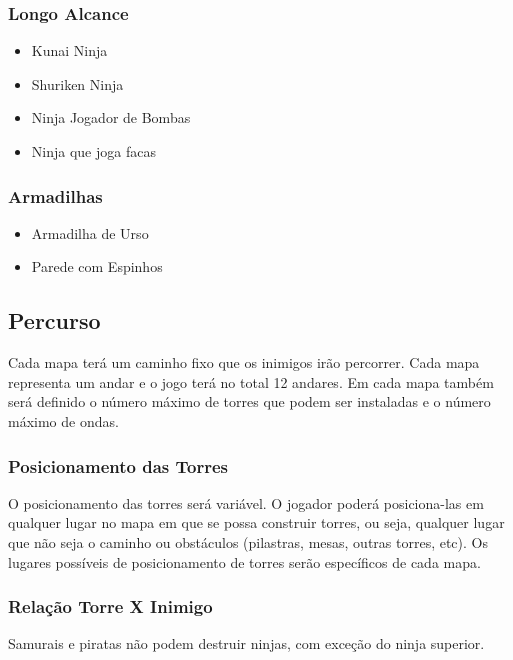 \documentclass[10pt,a4paper]{article}
\begin{document}
\subsubsection{Longo Alcance}
\begin{itemize}
\item Kunai Ninja
\item Shuriken Ninja
\item Ninja Jogador de Bombas
\item Ninja que joga facas
\end{itemize}

\subsubsection{Armadilhas}
\begin{itemize}
\item Armadilha de Urso
\item Parede com Espinhos
\end{itemize}

\subsection{Percurso}
	Cada mapa terá um caminho fixo que os inimigos irão percorrer. Cada mapa representa um
andar e o jogo terá no total 12 andares. Em cada mapa também será definido o número máximo de
torres que podem ser instaladas e o número máximo de ondas.\\
\subsubsection{Posicionamento das Torres}
	O posicionamento das torres será variável. O jogador poderá posiciona-las em qualquer lugar no
mapa em que se possa construir torres, ou seja, qualquer lugar que não seja o caminho ou obstáculos
(pilastras, mesas, outras torres, etc). Os lugares possíveis de posicionamento de torres serão específicos
de cada mapa.\\
\subsubsection{Relação Torre X Inimigo}
	Samurais e piratas não podem destruir ninjas, com exceção do ninja superior.\\
\end{document}
